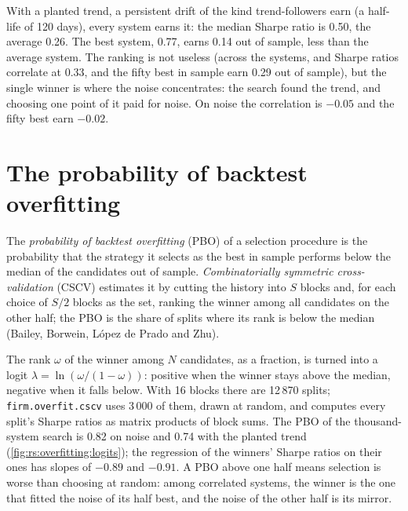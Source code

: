 With a planted trend, a persistent drift of the kind trend-followers earn (a half-life of 120 days), every system earns it: the median  Sharpe
ratio is 0.50, the average  0.26. The best  system, 0.77, earns 0.14 out of sample, less than the average system. The ranking is not useless (across the systems,  and
 Sharpe ratios correlate at 0.33, and the fifty best in sample earn 0.29 out of sample), but the single winner is where the noise concentrates: the
search found the trend, and choosing one point of it paid for noise. On noise the correlation is $-0.05$ and the fifty best earn $-0.02$.

\section{The probability of backtest overfitting}

\begin{definition}\label{def:rs:overfitting:pbo}
The \emph{probability of backtest overfitting} (PBO) of a selection procedure is the probability that the
strategy it selects as the best in sample performs below the median of the candidates out of sample. \emph{Combinatorially symmetric
cross-validation} (CSCV) estimates it by cutting the history into $S$ blocks and, for each choice of
$S/2$ blocks as the  set, ranking the  winner among all candidates on the other half; the PBO is the share of splits where its rank
is below the median (Bailey, Borwein, López de Prado and Zhu).
\end{definition}

The rank $\omega$ of the winner among $N$ candidates, as a fraction, is turned into a logit $\lambda = \ln(\omega/(1 - \omega))$: positive when the winner
stays above the median, negative when it falls below. With 16 blocks there are 12\,870 splits; \texttt{firm.overfit.cscv} uses 3\,000 of them, drawn at
random, and computes every split's Sharpe ratios as matrix products of block sums. The PBO of the thousand-system search is 0.82 on noise and 0.74 with the
planted trend (\cref{fig:rs:overfitting:logits}); the regression of the winners'  Sharpe ratios on their  ones has slopes of $-0.89$
and $-0.91$. A PBO above one half means selection is worse than choosing at random: among correlated systems, the  winner is the one that fitted
the noise of its half best, and the noise of the other half is its mirror.


